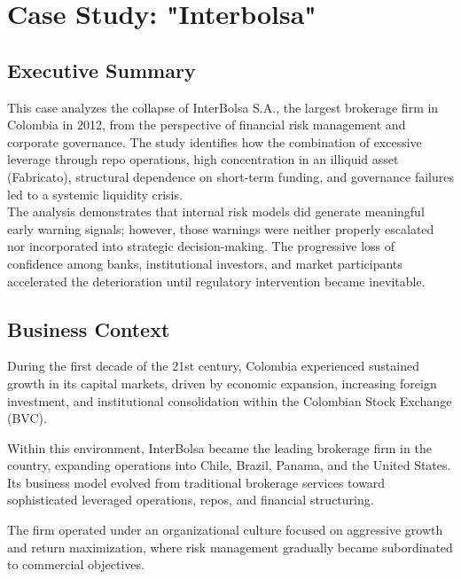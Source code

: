 \chapter{Case Study: "Interbolsa"}

\section{Executive Summary}

This case analyzes the collapse of InterBolsa S.A., the largest brokerage firm in Colombia in 2012, from the perspective of financial risk management and corporate governance. The study identifies how the combination of excessive leverage through repo operations, high concentration in an illiquid asset (Fabricato), structural dependence on short-term funding, and governance failures led to a systemic liquidity crisis.\\

The analysis demonstrates that internal risk models did generate meaningful early warning signals; however, those warnings were neither properly escalated nor incorporated into strategic decision-making. The progressive loss of confidence among banks, institutional investors, and market participants accelerated the deterioration until regulatory intervention became inevitable.

\vspace{0.5cm}

\section{Business Context}

During the first decade of the 21st century, Colombia experienced sustained growth in its capital markets, driven by economic expansion, increasing foreign investment, and institutional consolidation within the Colombian Stock Exchange (BVC).

Within this environment, InterBolsa became the leading brokerage firm in the country, expanding operations into Chile, Brazil, Panama, and the United States. Its business model evolved from traditional brokerage services toward sophisticated leveraged operations, repos, and financial structuring.

The firm operated under an organizational culture focused on aggressive growth and return maximization, where risk management gradually became subordinated to commercial objectives.

\vspace{0.5cm}


